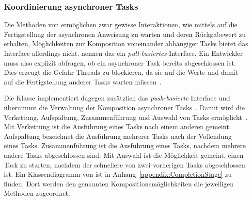 \subsubsection{Koordinierung asynchroner Tasks}\label{sec:CompletableFuture}
Die Methoden von \classFuture[<V>] ermöglichen zwar gewisse Interaktionen, wie mittels  auf die Fertigstellung der asynchronen \gls{Anweisung} zu warten und deren Rückgabewert zu erhalten, Möglichkeiten zur Komposition voneinander abhängiger Tasks bietet das Interface allerdings nicht. \textcite[S.~240]{Hettel2016} nennen das ein \emph{pull-basiertes} Interface. Ein Entwickler muss also explizit abfragen, ob ein asynchroner Task bereits abgeschlossen ist. Dies erzeugt die Gefahr Threads zu blockieren, da sie auf die Werte und damit auf die Fertigstellung anderer Tasks warten müssen~\cite[S.~239]{Hettel2016}.

Die Klasse \classCompletableFuture[<V>] implementiert dagegen zusätzlich das \emph{push-basierte} Interface \classCompletionStage{} und übernimmt die Verwaltung der Komposition asynchroner Tasks~\cite[S.~240~\psqq]{Hettel2016}. Damit wird die Verkettung, Aufspaltung, Zusammenführung und Auswahl von Tasks ermöglicht~\cite[S.~250~\psqq]{Hettel2016}. Mit Verkettung ist die Ausführung eines Tasks nach einem anderen gemeint. Aufspaltung bezeichnet die Ausführung mehrerer Tasks nach der Vollendung eines Tasks. Zusammenführung ist die Ausführung eines Tasks, nachdem mehrere andere Tasks abgeschlossen sind. Mit Auswahl ist die Möglichkeit gemeint, einen Task zu starten, nachdem der schnellere von zwei vorherigen Tasks abgeschlossen ist. Ein Klassendiagramm von \classCompletionStage{} ist in Anhang~\vref{appendix:CompletionStage} zu finden. Dort werden den genannten Kompositionsmöglichkeiten die jeweiligen Methoden zugeordnet.